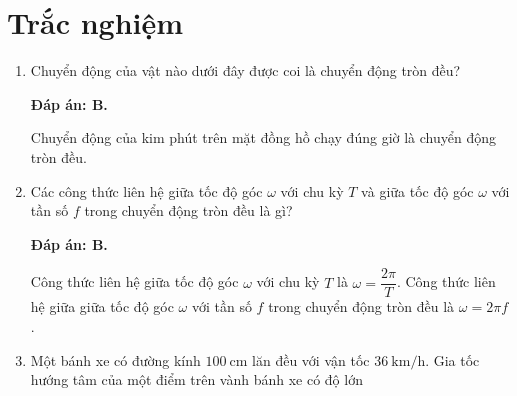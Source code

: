 \section{Trắc nghiệm}
\begin{enumerate}[label=\bfseries Câu \arabic*:]
	\item {}
	
	
	{
		Chuyển động của vật nào dưới đây được coi là chuyển động tròn đều?
	}
	
	\hideall
	{	
		\textbf{Đáp án: B.}
		
		Chuyển động của kim phút trên mặt đồng hồ chạy đúng giờ là chuyển động tròn đều.
	}
	\item {}
	
	
	{
		Các công thức liên hệ giữa tốc độ góc $\omega$ với chu kỳ $T$ và giữa tốc độ góc $\omega$ với tần số $f$ trong chuyển động tròn đều là gì?
	}
	
	\hideall
	{	
		\textbf{Đáp án: B.}
		
		Công thức liên hệ giữa tốc độ góc $\omega$ với chu kỳ $T$ là $\omega=\dfrac{2\pi}{T}$.
		Công thức liên hệ giữa giữa tốc độ góc $\omega$ với tần số $f$ trong chuyển động tròn đều là $\omega=2\pi f$.
	}
	\item {}
	
	
	{
		Một bánh xe có đường kính $\SI{100}{\centi\meter}$ lăn đều với vận tốc $\SI{36}{\kilo\meter/\hour}$. Gia tốc hướng tâm của một điểm trên vành bánh xe có độ lớn
	}
	

\end{enumerate}
